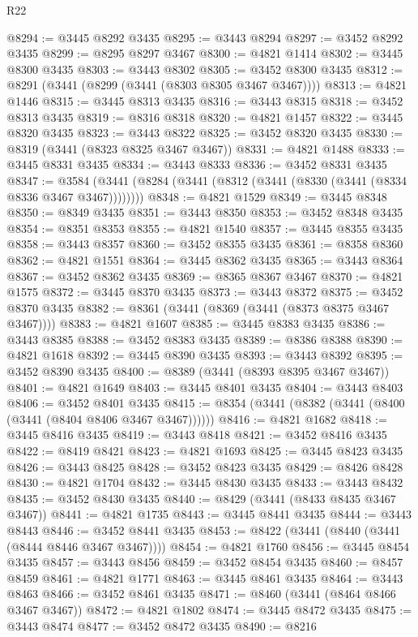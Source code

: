 \begin{lexlean}{R22}
\begin{coremodule}
@8294 := @3445 @8292 @3435
@8295 := @3443 @8294
@8297 := @3452 @8292 @3435
@8299 := @8295 @8297 @3467
@8300 := @4821 @1414
@8302 := @3445 @8300 @3435
@8303 := @3443 @8302
@8305 := @3452 @8300 @3435
@8312 := @8291 (@3441 (@8299 (@3441 (@8303 @8305 @3467 @3467))))
@8313 := @4821 @1446
@8315 := @3445 @8313 @3435
@8316 := @3443 @8315
@8318 := @3452 @8313 @3435
@8319 := @8316 @8318
@8320 := @4821 @1457
@8322 := @3445 @8320 @3435
@8323 := @3443 @8322
@8325 := @3452 @8320 @3435
@8330 := @8319 (@3441 (@8323 @8325 @3467 @3467))
@8331 := @4821 @1488
@8333 := @3445 @8331 @3435
@8334 := @3443 @8333
@8336 := @3452 @8331 @3435
@8347 := @3584 (@3441 (@8284 (@3441 (@8312 (@3441 (@8330 (@3441 (@8334 @8336 @3467 @3467))))))))
@8348 := @4821 @1529
@8349 := @3445 @8348
@8350 := @8349 @3435
@8351 := @3443 @8350
@8353 := @3452 @8348 @3435
@8354 := @8351 @8353
@8355 := @4821 @1540
@8357 := @3445 @8355 @3435
@8358 := @3443 @8357
@8360 := @3452 @8355 @3435
@8361 := @8358 @8360
@8362 := @4821 @1551
@8364 := @3445 @8362 @3435
@8365 := @3443 @8364
@8367 := @3452 @8362 @3435
@8369 := @8365 @8367 @3467
@8370 := @4821 @1575
@8372 := @3445 @8370 @3435
@8373 := @3443 @8372
@8375 := @3452 @8370 @3435
@8382 := @8361 (@3441 (@8369 (@3441 (@8373 @8375 @3467 @3467))))
@8383 := @4821 @1607
@8385 := @3445 @8383 @3435
@8386 := @3443 @8385
@8388 := @3452 @8383 @3435
@8389 := @8386 @8388
@8390 := @4821 @1618
@8392 := @3445 @8390 @3435
@8393 := @3443 @8392
@8395 := @3452 @8390 @3435
@8400 := @8389 (@3441 (@8393 @8395 @3467 @3467))
@8401 := @4821 @1649
@8403 := @3445 @8401 @3435
@8404 := @3443 @8403
@8406 := @3452 @8401 @3435
@8415 := @8354 (@3441 (@8382 (@3441 (@8400 (@3441 (@8404 @8406 @3467 @3467))))))
@8416 := @4821 @1682
@8418 := @3445 @8416 @3435
@8419 := @3443 @8418
@8421 := @3452 @8416 @3435
@8422 := @8419 @8421
@8423 := @4821 @1693
@8425 := @3445 @8423 @3435
@8426 := @3443 @8425
@8428 := @3452 @8423 @3435
@8429 := @8426 @8428
@8430 := @4821 @1704
@8432 := @3445 @8430 @3435
@8433 := @3443 @8432
@8435 := @3452 @8430 @3435
@8440 := @8429 (@3441 (@8433 @8435 @3467 @3467))
@8441 := @4821 @1735
@8443 := @3445 @8441 @3435
@8444 := @3443 @8443
@8446 := @3452 @8441 @3435
@8453 := @8422 (@3441 (@8440 (@3441 (@8444 @8446 @3467 @3467))))
@8454 := @4821 @1760
@8456 := @3445 @8454 @3435
@8457 := @3443 @8456
@8459 := @3452 @8454 @3435
@8460 := @8457 @8459
@8461 := @4821 @1771
@8463 := @3445 @8461 @3435
@8464 := @3443 @8463
@8466 := @3452 @8461 @3435
@8471 := @8460 (@3441 (@8464 @8466 @3467 @3467))
@8472 := @4821 @1802
@8474 := @3445 @8472 @3435
@8475 := @3443 @8474
@8477 := @3452 @8472 @3435
@8490 := @8216

\end{coremodule}
\end{lexlean}
